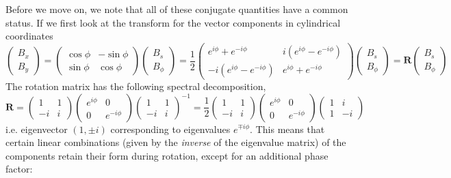 Before we move on, we note that all of these conjugate quantities have a common status.
If we first look at the transform for the vector components in cylindrical coordinates
\[
    \begin{pmatrix} B_x \\ B_y \end{pmatrix} = 
    \begin{pmatrix}
        \cos\phi & -\sin\phi \\ 
        \sin\phi & \cos\phi 
    \end{pmatrix} \begin{pmatrix} B_s \\ B_\phi \end{pmatrix} = \frac{1}{2}
    \begin{pmatrix}
        e^{i\phi} + e^{-i\phi} & i \left(e^{i\phi} - e^{-i\phi}\right) \\ 
        - i \left(e^{i\phi} - e^{-i\phi}\right) & e^{i\phi} + e^{-i\phi}
    \end{pmatrix} \begin{pmatrix} B_s \\ B_\phi \end{pmatrix} = \mathbf{R} \begin{pmatrix} B_s \\ B_\phi \end{pmatrix}
\]
The rotation matrix has the following spectral decomposition,
\[
    \mathbf{R} =
    \begin{pmatrix} 1 & 1 \\ -i & i \end{pmatrix}
    \begin{pmatrix} e^{i\phi} & 0 \\ 0 & e^{-i\phi} \end{pmatrix}
    \begin{pmatrix} 1 & 1 \\ -i & i \end{pmatrix}^{-1} = \frac{1}{2}
    \begin{pmatrix} 1 & 1 \\ -i & i \end{pmatrix}
    \begin{pmatrix} e^{i\phi} & 0 \\ 0 & e^{-i\phi} \end{pmatrix}
    \begin{pmatrix} 1 & i \\ 1 & -i \end{pmatrix}
\]
i.e. eigenvector $(1, \pm i)$ corresponding to eigenvalues $e^{\mp i\phi}$. This means that certain linear combinations (given by the \textit{inverse} of the eigenvalue matrix) of the components retain their form during rotation, except for an additional phase factor:
